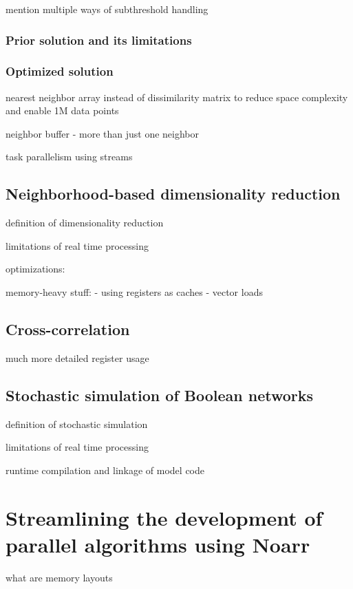 \documentclass[12pt,a4paper]{report}
\begin{document}
mention multiple ways of subthreshold handling 

\subsection{Prior solution and its limitations}

\subsection{Optimized solution}

nearest neighbor array instead of dissimilarity matrix to reduce space complexity and enable 1M data points

neighbor buffer - more than just one neighbor

task parallelism using streams



\section{Neighborhood-based dimensionality reduction}

definition of dimensionality reduction

limitations of real time processing


optimizations:

memory-heavy stuff:
- using registers as caches
- vector loads

\section{Cross-correlation}

much more detailed register usage 

\section{Stochastic simulation of Boolean networks}

definition of stochastic simulation

limitations of real time processing

runtime compilation and linkage of model code

\chapter{Streamlining the development of parallel algorithms using Noarr}

what are memory layouts 
\end{document}
